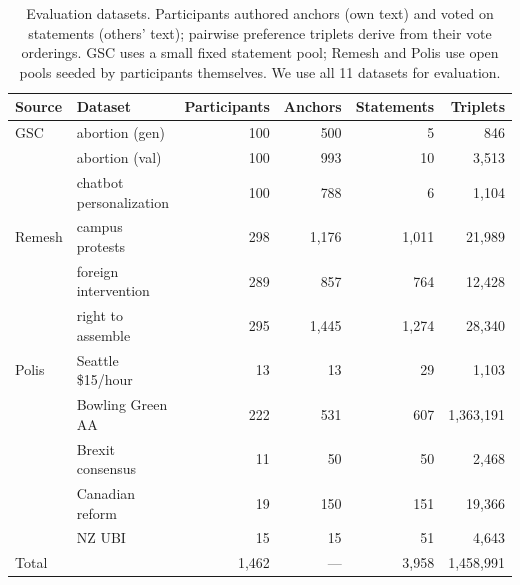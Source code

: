 \begin{table}[t]
\centering
\small
\caption{Evaluation datasets. Participants authored anchors (own text) and voted on statements (others' text); pairwise preference triplets derive from their vote orderings. GSC uses a small fixed statement pool; Remesh and Polis use open pools seeded by participants themselves. We use all 11 datasets for evaluation.}
\label{tab:datasets}
\begin{tabular*}{\textwidth}{@{\extracolsep{\fill}}llrrrr@{}}
\toprule
Source & Dataset & Participants & Anchors & Statements & Triplets \\
\midrule
GSC & abortion (gen) & 100 & 500 & 5 & 846 \\
 & abortion (val) & 100 & 993 & 10 & 3,513 \\
 & chatbot personalization & 100 & 788 & 6 & 1,104 \\
Remesh & campus protests & 298 & 1,176 & 1,011 & 21,989 \\
 & foreign intervention & 289 & 857 & 764 & 12,428 \\
 & right to assemble & 295 & 1,445 & 1,274 & 28,340 \\
Polis & Seattle \$15/hour & 13 & 13 & 29 & 1,103 \\
 & Bowling Green AA & 222 & 531 & 607 & 1,363,191 \\
 & Brexit consensus & 11 & 50 & 50 & 2,468 \\
 & Canadian reform & 19 & 150 & 151 & 19,366 \\
 & NZ UBI & 15 & 15 & 51 & 4,643 \\
\midrule
\multicolumn{2}{l}{Total} & 1,462 & --- & 3,958 & 1,458,991 \\
\bottomrule
\end{tabular*}
\end{table}

